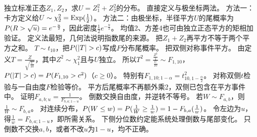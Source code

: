 {独立标准正态$Z_1,Z_2$，求$U=Z_1^2+Z_2^2$的分布。}
{直接定义与极坐标两法。}
{方法一：卡方定义给$U\sim\chi_2^2=\operatorname{Exp}(\frac{1}{2})$。
方法二：由极坐标，半径平方$U$的尾概率为$P(R>\sqrt u)=e^{-\frac{u}{2}}$，因此密度$\frac12e^{-\frac{u}{2}}$。
均值2、方差4也可由独立正态平方的矩相加验证。}
{定义法最短，几何法说明指数尾的来源。}
{把$Z_1+Z_2$再平方不等于两个平方之和。}
{$T\sim t_{10}$，把$\Pp(|T|>c)$写成$F$分布尾概率。}
{把双侧对称事件平方。}
{由定义$T=\frac{Z}{\sqrt{\frac{U}{10}}}$，其中$Z^2\sim\chi_1^2$且与$U$独立。
所以$T^2=\frac{\frac{Z^2}{1}}{\frac{U}{10}}\sim F_{1,10}$，$\Pp(|T|>c)=\Pp(F_{1,10}>c^2)$（$c\ge0$）。
特别有$F_{1,10;1-\alpha}=t_{10,1-\frac{\alpha}{2}}^2$。}
{对称双侧$t$检验与一自由度$F$检验等价。}
{平方后尾概率不再额外乘2，双侧已包含在平方事件中。}
{证明$F_{a,b;u}=\frac{1}{F_{b,a;1-u}}$。}
{倒数交换自由度，并逆转不等号。}
{若$W\sim F_{a,b}$，则$\frac{1}{W}\sim F_{b,a}$。
对连续分布，$P(W\le w)=P(\frac{1}{W}\ge\frac{1}{w})=1-F_{b,a}(\frac{1}{w})$。
令左边为$u$，得$\frac{1}{w}=F_{b,a;1-u}$，即所需关系。}
{下侧分位数约定能系统处理倒数与尾部变化。}
{只倒数不交换$a,b$，或者不改$u$为$1-u$，均不正确。}

